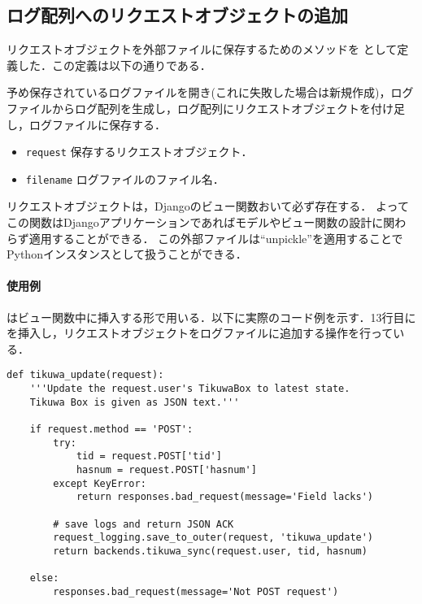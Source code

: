\subsection{ログ配列へのリクエストオブジェクトの追加}
リクエストオブジェクトを外部ファイルに保存するためのメソッドを \savefunc として定義した．この定義は以下の通りである．

\begin{pydef}

予め保存されているログファイルを開き(これに失敗した場合は新規作成)，ログファイルからログ配列を生成し，ログ配列にリクエストオブジェクトを付け足し，ログファイルに保存する．

\param
\begin{itemize}
\item
{\tt request} 保存するリクエストオブジェクト．
\item
{\tt filename} ログファイルのファイル名．
\end{itemize}

\end{pydef}

リクエストオブジェクトは，Djangoのビュー関数おいて必ず存在する．
よってこの関数はDjangoアプリケーションであればモデルやビュー関数の設計に関わらず適用することができる．
この外部ファイルは``unpickle''を適用することでPythonインスタンスとして扱うことができる．

\paragraph{使用例}
\savefunc はビュー関数中に挿入する形で用いる．以下に実際のコード例を示す．13行目に \savefunc を挿入し，リクエストオブジェクトをログファイルに追加する操作を行っている．

\begin{lstlisting}
def tikuwa_update(request):
    '''Update the request.user's TikuwaBox to latest state.
    Tikuwa Box is given as JSON text.'''

    if request.method == 'POST':
        try:
            tid = request.POST['tid']
            hasnum = request.POST['hasnum']
        except KeyError:
            return responses.bad_request(message='Field lacks')

        # save logs and return JSON ACK
        request_logging.save_to_outer(request, 'tikuwa_update')
        return backends.tikuwa_sync(request.user, tid, hasnum)

    else:
        responses.bad_request(message='Not POST request')
\end{lstlisting}

